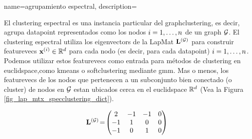 {name={agrupamiento espectral},
	description={El \gls{clustering} espectral  es una instancia particular del 
		\gls{graphclustering}, es decir, agrupa \gls{datapoint}
		representados como los nodos $i=1,\ldots,n$ de un \gls{graph} $\mathcal{G}$. 
		El \gls{clustering} espectral utiliza los \gls{eigenvector}s de la \gls{LapMat} ${\bf L}^{(\mathcal{G})}$ 
		para construir \gls{featurevec}s ${\bf x}^{(i)} \in \mathbb{R}^{d}$ 
		para cada nodo (es decir, para cada \gls{datapoint}) $i=1,\ldots,n$. Podemos utilizar estos \gls{featurevec}s 
		como entrada para métodos de \gls{clustering} en \gls{euclidspace},como \gls{kmeans} 
		o \gls{softclustering} mediante \gls{gmm}. Mas o menos, los \gls{featurevec}s de los nodos 
		que pertenecen a un subconjunto bien conectado (o \gls{cluster}) de nodos en $\mathcal{G}$ estan ubicados 
		cerca en el \gls{euclidspace} $\mathbb{R}^{d}$ (Vea la Figura \ref{fig_lap_mtx_specclustering_dict}). 
		\begin{figure}[H]
			\begin{center}
				\begin{minipage}{0.4\textwidth}
				\end{minipage} 
				\hspace*{5mm}
				\begin{minipage}{0.4\textwidth}
					\begin{equation} 
						{\bf L}^{(\mathcal{G})}\!=\!
						\begin{pmatrix} 
							2 & -1 & -1 & 0 \\ 
							-1 & 1 & 0 & 0 \\  
							-1 & 0 & 1 & 0 \\ 

\end{pmatrix}
\end{equation}
\end{minipage}
\end{center}
\end{figure}}}
